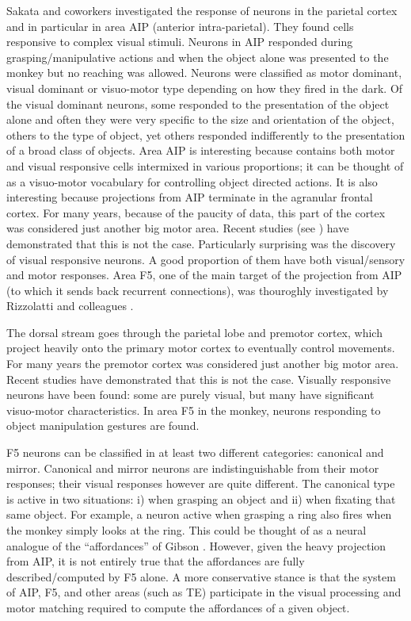 Sakata and coworkers \cite{sakata-taira-kusunoki-murata-tanaka-1997} 
investigated the response of neurons in the 
parietal cortex and in particular in area AIP (anterior intra-parietal). They found 
cells responsive to complex visual stimuli. Neurons in AIP responded during 
grasping/manipulative actions and when the object alone was presented to the 
monkey but no reaching was allowed. Neurons were classified as motor dominant, 
visual dominant or visuo-motor type depending on how they fired in the dark. Of 
the visual dominant neurons, some responded to the presentation of the 
object alone and often they were very specific to the size and orientation of the 
object, others to the type of object, yet others responded indifferently to the 
presentation of a broad class of objects. Area AIP is interesting because 
contains both motor and visual responsive cells intermixed in various proportions; 
it can be thought of as a visuo-motor vocabulary for controlling object directed 
actions. It is also interesting because projections from AIP terminate in the 
agranular frontal cortex. For many years, because of the paucity of data, this 
part of the cortex was considered just another big motor area. Recent studies 
(see \cite{jeannerod97cognitive}\cite{fadiga00visuomotor}) have demonstrated 
that this is not the case. Particularly surprising was the discovery of visual 
responsive neurons. A good proportion of them have both visual/sensory and motor 
responses. Area F5, one of the main target of the projection from AIP (to which 
it sends back recurrent connections), was thouroghly investigated by Rizzolatti 
and colleagues \cite{gallese-fadiga-fogassi-rizzolatti-1996}.

%
%
\ifverbose
The dorsal stream goes through the parietal lobe and premotor cortex,
which project heavily onto the primary motor cortex to eventually
control movements. For many years the premotor cortex was considered
just another big motor area.  Recent studies
\cite{jeannerod97cognitive} have demonstrated that this is not the
case.  Visually responsive neurons have been found: some are purely
visual, but many have significant visuo-motor characteristics. In area
F5 in the monkey, neurons responding to object manipulation gestures
are found.  
\fi

F5 neurons can be classified in at least two different categories:
canonical and mirror. Canonical and mirror neurons are 
indistinguishable from their motor responses; their visual responses however 
are quite different. The canonical type is active in two situations:
i) when grasping an object and ii) when fixating that same object.
For example, a neuron active when grasping a ring also fires when the
monkey simply looks at the ring.  This could be thought of as a neural
analogue of the ``affordances'' of Gibson \cite{gibson77theory}. 
However, given the heavy projection from AIP, it is not entirely
true that the affordances are fully described/computed by F5 alone.
A more conservative stance is that the system of AIP, F5, and other areas 
(such as TE) participate in the visual processing and motor matching required 
to compute the affordances of a given object.  

